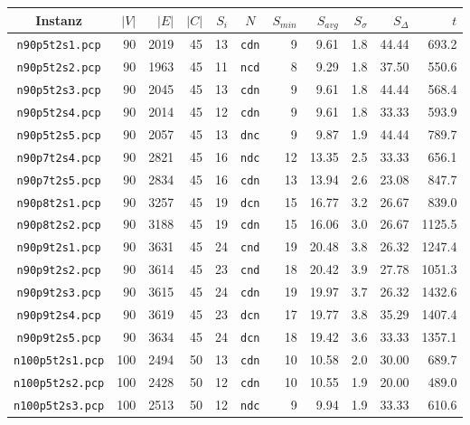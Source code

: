 \begin{table}[!htbp]
\centering
\begin{tabular}{c|rrr|r|c|rrr|r|r}
Instanz & $|V|$ & $|E|$ & $|C|$ & $S_i$ & $N$ & $S_{min}$ & $S_{avg}$ & $S_{\sigma}$ & $S_{\Delta}$ & $t$ \\
\hline\hline
\texttt{n90p5t2s1.pcp} & 90	& 2019	& 45 & 13 & \texttt{cdn} & 9 & 9.61 & 1.8 & 44.44 & 693.2\\
\texttt{n90p5t2s2.pcp} & 90	& 1963	& 45 & 11 & \texttt{ncd} & 8 & 9.29 & 1.8 & 37.50 & 550.6\\
\texttt{n90p5t2s3.pcp} & 90	& 2045	& 45 & 13 & \texttt{cdn} & 9 & 9.61 & 1.8 & 44.44 & 568.4\\
\texttt{n90p5t2s4.pcp} & 90	& 2014	& 45 & 12 & \texttt{cdn} & 9 & 9.61 & 1.8 & 33.33 & 593.9\\
\texttt{n90p5t2s5.pcp} & 90	& 2057	& 45 & 13 & \texttt{dnc} & 9 & 9.87 & 1.9 & 44.44 & 789.7\\
\texttt{n90p7t2s4.pcp} & 90	& 2821	& 45 & 16 & \texttt{ndc} & 12 & 13.35 & 2.5 & 33.33 & 656.1\\
\texttt{n90p7t2s5.pcp} & 90	& 2834	& 45 & 16 & \texttt{cdn} & 13 & 13.94 & 2.6 & 23.08 & 847.7\\
\texttt{n90p8t2s1.pcp} & 90	& 3257	& 45 & 19 & \texttt{dcn} & 15 & 16.77 & 3.2 & 26.67 & 839.0\\
\texttt{n90p8t2s2.pcp} & 90	& 3188	& 45 & 19 & \texttt{cdn} & 15 & 16.06 & 3.0 & 26.67 & 1125.5\\
\texttt{n90p9t2s1.pcp} & 90	& 3631	& 45	& 24 & \texttt{cnd} & 19 & 20.48 & 3.8 & 26.32 & 1247.4\\
\texttt{n90p9t2s2.pcp} & 90	& 3614	& 45	& 23 & \texttt{cnd} & 18 & 20.42 & 3.9 & 27.78 & 1051.3\\
\texttt{n90p9t2s3.pcp} & 90	& 3615	& 45	& 24 & \texttt{cdn} & 19 & 19.97 & 3.7 & 26.32 & 1432.6\\
\texttt{n90p9t2s4.pcp} & 90	& 3619	& 45	& 23 & \texttt{dcn} & 17 & 19.77 & 3.8 & 35.29 & 1407.4\\
\texttt{n90p9t2s5.pcp} & 90	& 3634	& 45	& 24 & \texttt{dcn} & 18 & 19.42 & 3.6 & 33.33 & 1357.1\\
\texttt{n100p5t2s1.pcp} & 100	& 2494	& 50	& 13 & \texttt{cdn} & 10 & 10.58 & 2.0 & 30.00 & 689.7\\
\texttt{n100p5t2s2.pcp} & 100	& 2428	& 50	& 12 & \texttt{cdn} & 10 & 10.55 & 1.9 & 20.00 & 489.0\\
\texttt{n100p5t2s3.pcp} & 100	& 2513	& 50	& 12 & \texttt{ndc} & 9 & 9.94 & 1.9 & 33.33 & 610.6\\

\end{tabular}
\end{table}
